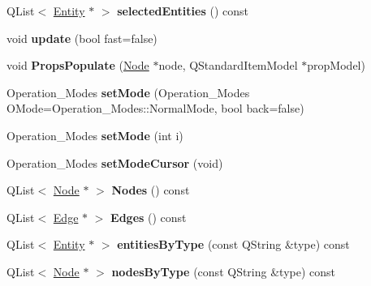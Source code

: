 \begin{DoxyCompactItemize}
\item 
\mbox{\label{class_graph_widget_a2baa039b26ef13b12bc79264ecd4426c}} 
Q\+List$<$ \hyperlink{class_entity}{Entity} $\ast$ $>$ {\bfseries selected\+Entities} () const
\item 
\mbox{\label{class_graph_widget_a7dfb5058122e9e84a9becde7420e0943}} 
void {\bfseries update} (bool fast=false)
\item 
\mbox{\label{class_graph_widget_a9d2cf64be81bb0f0bfa3f07133c27cea}} 
void {\bfseries Props\+Populate} (\hyperlink{class_node}{Node} $\ast$node, Q\+Standard\+Item\+Model $\ast$prop\+Model)
\item 
\mbox{\label{class_graph_widget_a24a9c0a4910bd8b9050df9399f3f6297}} 
Operation\+\_\+\+Modes {\bfseries set\+Mode} (Operation\+\_\+\+Modes O\+Mode=Operation\+\_\+\+Modes\+::\+Normal\+Mode, bool back=false)
\item 
\mbox{\label{class_graph_widget_a25f9580a2740452511081512b870739f}} 
Operation\+\_\+\+Modes {\bfseries set\+Mode} (int i)
\item 
\mbox{\label{class_graph_widget_a771dbfe146b575c1e6f2e5bcf0d3fdda}} 
Operation\+\_\+\+Modes {\bfseries set\+Mode\+Cursor} (void)
\item 
\mbox{\label{class_graph_widget_ada2db7600c06003029051e19c3ac41e9}} 
Q\+List$<$ \hyperlink{class_node}{Node} $\ast$ $>$ {\bfseries Nodes} () const
\item 
\mbox{\label{class_graph_widget_a09efd16533da2fda657cbb735d0dc6fe}} 
Q\+List$<$ \hyperlink{class_edge}{Edge} $\ast$ $>$ {\bfseries Edges} () const
\item 
\mbox{\label{class_graph_widget_adb46a922d70f2eaa62174d6a4ca48a02}} 
Q\+List$<$ \hyperlink{class_entity}{Entity} $\ast$ $>$ {\bfseries entities\+By\+Type} (const Q\+String \&type) const
\item 
\mbox{\label{class_graph_widget_a8d2a8c07f1ab60e462e753bacbe3c789}} 
Q\+List$<$ \hyperlink{class_node}{Node} $\ast$ $>$ {\bfseries nodes\+By\+Type} (const Q\+String \&type) const

\end{DoxyCompactItemize}
